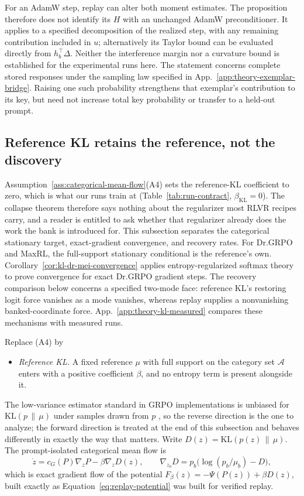 For an AdamW step, replay can alter both moment estimates. The proposition
therefore does not identify its $H$ with an unchanged AdamW preconditioner.
It applies to a specified decomposition of the realized step, with any
remaining contribution included in $u$; alternatively its Taylor bound can
be evaluated directly from $h_b^\top\Delta$. Neither the interference margin
nor a curvature bound is established for the experimental runs here.
The statement concerns complete stored responses under the sampling law
specified in App.~\ref{app:theory-exemplar-bridge}. Raising one such
probability strengthens that exemplar's contribution to its key, but need
not increase total key probability or transfer to a held-out prompt.


\subsection{Reference KL retains the reference, not the discovery}
\label{app:theory-kl}

Assumption~\ref{ass:categorical-mean-flow}(A4) sets the reference-KL
coefficient to zero, which is what our runs train at
(Table~\ref{tab:run-contract}, $\beta_{\mathrm{KL}}=0$). The collapse theorem
therefore says nothing about the regularizer most RLVR recipes carry, and a
reader is entitled to ask whether that regularizer already does the work the
bank is introduced for. This subsection separates the categorical stationary target, exact-gradient
convergence, and recovery rates. For Dr.GRPO and MaxRL, the full-support
stationary conditional is the reference's own.
Corollary~\ref{cor:kl-dr-mei-convergence} applies entropy-regularized softmax
theory to prove convergence for exact Dr.GRPO gradient steps. The recovery
comparison below concerns a specified two-mode face: reference KL's
restoring logit force vanishes as a mode vanishes, whereas replay supplies
a nonvanishing banked-coordinate force.
App.~\ref{app:theory-kl-measured} compares these mechanisms with measured runs.

Replace (A4) by

\begin{itemize}
\item[(A4$'$)] \emph{Reference KL.} A fixed reference $\mu$ with full support
  on the category set $\mathcal A$ enters with a positive coefficient $\beta$,
  and no entropy term is present alongside it.
\end{itemize}
The low-variance estimator standard in GRPO implementations is unbiased for
$\mathrm{KL}(p\,\|\,\mu)$ under samples drawn from $p$
\citep{shao2024deepseekmath}, so the reverse direction is the one to analyze;
the forward direction is treated at the end of this subsection and behaves
differently in exactly the way that matters. Write
$D(z)=\mathrm{KL}(p(z)\,\|\,\mu)$. The prompt-isolated categorical mean flow is
\begin{equation}
  \dot z=c_G(P)\nabla_zP-\beta\nabla_zD(z),
  \qquad
  \nabla_{z_b}D=p_b\big(\log(p_b/\mu_b)-D\big),
  \label{eq:kl-mean-flow}
\end{equation}
which is exact gradient flow of the potential
$F_\beta(z)=-\Psi(P(z))+\beta D(z)$, built exactly as
Equation~\eqref{eq:replay-potential} was built for verified replay.

